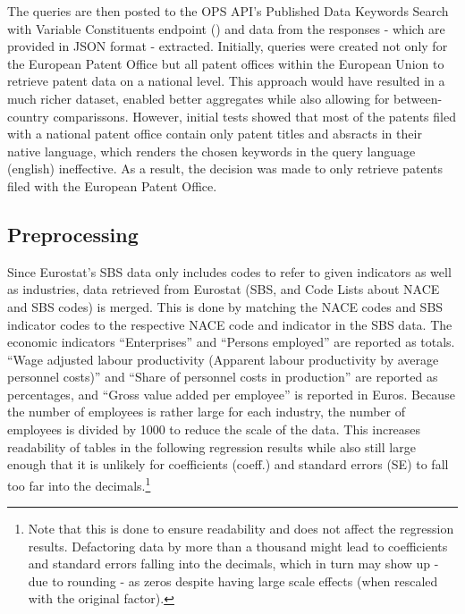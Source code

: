 \documentclass[
  11,
  a4paperpaper,
]{article}
\begin{document}

The queries are then posted to the OPS API's Published Data Keywords
Search with Variable Constituents endpoint
() and data from the responses - which are provided in JSON
format - extracted. Initially, queries were created not only for the
European Patent Office but all patent offices within the European Union
to retrieve patent data on a national level. This approach would have
resulted in a much richer dataset, enabled better aggregates while also
allowing for between-country comparissons. However, initial tests showed
that most of the patents filed with a national patent office contain
only patent titles and absracts in their native language, which renders
the chosen keywords in the query language (english) ineffective. As a
result, the decision was made to only retrieve patents filed with the
European Patent Office.

\subsection{Preprocessing}\label{sec-preprocessing}

Since Eurostat's SBS data only includes codes to refer to given
indicators as well as industries, data retrieved from Eurostat (SBS, and
Code Lists about NACE and SBS codes) is merged. This is done by matching
the NACE codes and SBS indicator codes to the respective NACE code and
indicator in the SBS data. The economic indicators ``Enterprises'' and
``Persons employed'' are reported as totals. ``Wage adjusted labour
productivity (Apparent labour productivity by average personnel costs)''
and ``Share of personnel costs in production'' are reported as
percentages, and ``Gross value added per employee'' is reported in
Euros. Because the number of employees is rather large for each
industry, the number of employees is divided by 1000 to reduce the scale
of the data. This increases readability of tables in the following
regression results while also still large enough that it is unlikely for
coefficients (coeff.) and standard errors (SE) to fall too far into the
decimals.\footnote{Note that this is done to ensure readability and does
  not affect the regression results. Defactoring data by more than a
  thousand might lead to coefficients and standard errors falling into
  the decimals, which in turn may show up - due to rounding - as zeros
  despite having large scale effects (when rescaled with the original
  factor).\label{note3}}
\end{document}
